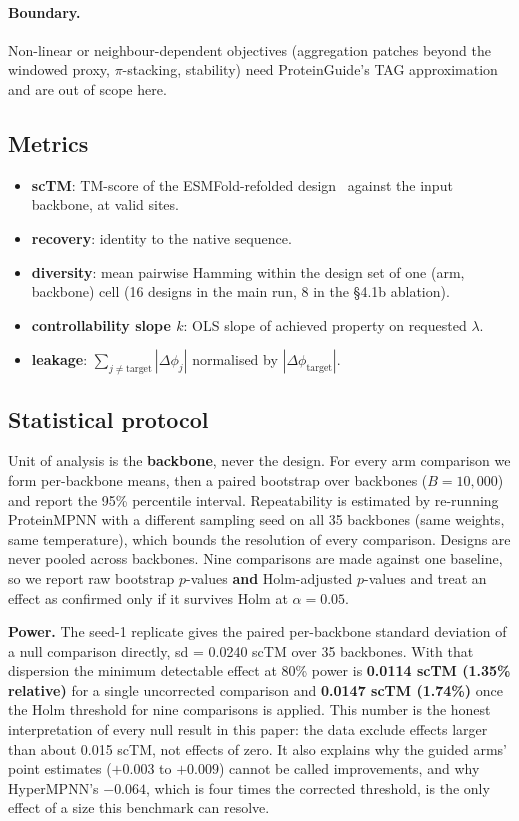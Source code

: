 \paragraph{Boundary.}
Non-linear or neighbour-dependent objectives (aggregation patches beyond the
windowed proxy, $\pi$-stacking, stability) need ProteinGuide's TAG approximation
and are out of scope here.

\subsection{Metrics}
\label{sec:metrics}

\begin{itemize}
\item \textbf{scTM}: TM-score of the ESMFold-refolded design~\cite{esmfold}
  against the input backbone, at valid sites.
\item \textbf{recovery}: identity to the native sequence.
\item \textbf{diversity}: mean pairwise Hamming within the design set of one
  (arm, backbone) cell (16 designs in the main run, 8 in the \S4.1b ablation).
\item \textbf{controllability slope $k$}: OLS slope of achieved property on
  requested $\lambda$.
\item \textbf{leakage}: $\sum_{j\neq\mathrm{target}} |\Delta\phi_j|$
  normalised by $|\Delta\phi_{\mathrm{target}}|$.
\end{itemize}

\subsection{Statistical protocol}
\label{sec:stats}

Unit of analysis is the \textbf{backbone}, never the design. For every arm
comparison we form per-backbone means, then a paired bootstrap over backbones
($B = 10{,}000$) and report the 95\% percentile interval. Repeatability is
estimated by re-running ProteinMPNN with a different sampling seed on all 35
backbones (same weights, same temperature), which bounds the resolution of
every comparison. Designs are never pooled across backbones. Nine comparisons are made
against one baseline, so we report raw bootstrap $p$-values \textbf{and}
Holm-adjusted $p$-values and treat an effect as confirmed only if it survives
Holm at $\alpha = 0.05$.

\textbf{Power.} The seed-1 replicate gives the paired per-backbone standard
deviation of a null comparison directly, sd = 0.0240 scTM over 35 backbones.
With that dispersion the minimum detectable effect at 80\% power is
\textbf{0.0114 scTM (1.35\% relative)} for a single uncorrected comparison and
\textbf{0.0147 scTM (1.74\%)} once the Holm threshold for nine comparisons is
applied. This number is the honest interpretation of every null result in this
paper: the data exclude effects larger than about 0.015 scTM, not effects of
zero. It also explains why the guided arms' point estimates ($+0.003$ to
$+0.009$) cannot be called improvements, and why HyperMPNN's $-0.064$, which is
four times the corrected threshold, is the only effect of a size this benchmark
can resolve.
